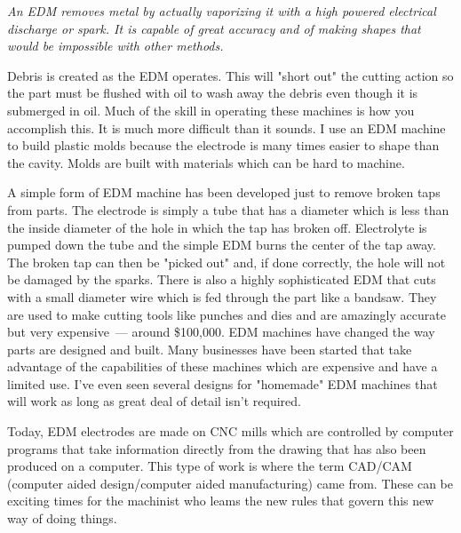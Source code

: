\bigskip
\textit{An EDM removes metal by actually vaporizing it with a high powered
electrical discharge or spark. It is capable of great accuracy and of making
shapes that would be impossible with other methods.}
\bigskip

Debris is created as the EDM operates. This will "short out" the cutting action
so the part must be flushed with oil to wash away the debris even though it is
submerged in oil. Much of the skill in operating these machines is how you
accomplish this. It is much more difficult than it sounds. I use an EDM machine
to build plastic molds because the electrode is many times easier to shape than
the cavity. Molds are built with materials which can be hard to machine.


A simple form of EDM machine has been developed just to remove broken taps from
parts. The electrode is simply a tube that has a diameter which is less than the
inside diameter of the hole in which the tap has broken off. Electrolyte is
pumped down the tube and the simple EDM burns the center of the tap away. The
broken tap can then be "picked out" and, if done correctly, the hole will not be
damaged by the sparks. There is also a highly sophisticated EDM that cuts with a
small diameter wire which is fed through the part like a bandsaw. They are used
to make cutting tools like punches and dies and are amazingly accurate but very
expensive\ --- around \$100,000. EDM machines have changed the way parts are
designed and built. Many businesses have been started that take advantage of the
capabilities of these machines which are expensive and have a limited use. I've
even seen several designs for "homemade" EDM machines that will work as long as
great deal of detail isn't required.


Today, EDM electrodes are made on CNC mills which are controlled by computer
programs that take information directly from the drawing that has also been
produced on a computer. This type of work is where the term CAD/CAM (computer
aided design/computer aided manufacturing) came from. These can be exciting
times for the machinist who leams the new rules that govern this new way of
doing things.

\secup

\secdown


